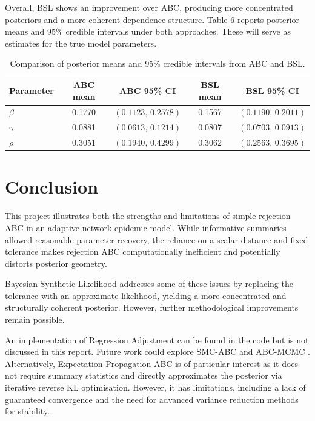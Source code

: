 \documentclass[12pt, a4paper]{article}
\begin{document}
Overall, BSL shows an improvement over ABC, producing more concentrated posteriors and a more coherent dependence structure. Table 6 reports posterior means and 95\% credible intervals under both approaches. These will serve as estimates for the true model parameters.

\begin{table}[H]
\centering
\begin{tabular}{lcccc}
\toprule
Parameter & ABC mean & ABC 95\% CI & BSL mean & BSL 95\% CI \\
\midrule
$\beta$  & 0.1770 & $(0.1123,\,0.2578)$ & 0.1567 & $(0.1190,\,0.2011)$ \\
$\gamma$ & 0.0881 & $(0.0613,\,0.1214)$ & 0.0807 & $(0.0703,\,0.0913)$ \\
$\rho$   & 0.3051 & $(0.1940,\,0.4299)$ & 0.3062 & $(0.2563,\,0.3695)$ \\
\bottomrule
\end{tabular}
\caption{Comparison of posterior means and 95\% credible intervals 
         from ABC and BSL.}
\label{tab:ci_comparison}
\end{table}


\section{Conclusion}
This project illustrates both the strengths and limitations of simple
rejection ABC in an adaptive-network epidemic model. While informative
summaries allowed reasonable parameter recovery, the reliance on a scalar
distance and fixed tolerance makes rejection ABC computationally inefficient
and potentially distorts posterior geometry.

Bayesian Synthetic Likelihood addresses some of these issues by replacing
the tolerance with an approximate likelihood, yielding a more concentrated
and structurally coherent posterior. However, further methodological
improvements remain possible.

An implementation of Regression Adjustment \citep{beaumont2002approximate} can be found in the code but is not discussed in this report. Future work could explore SMC-ABC \citep{Sisson2007} and ABC-MCMC \citep{marjoram2013approximation}. Alternatively, Expectation-Propagation ABC \citep{barthelme2014expectation} is of particular interest as it does not require summary statistics and directly approximates the posterior via iterative reverse KL optimisation. However, it has limitations, including a lack of guaranteed convergence and the need for advanced variance reduction methods for stability. 
\end{document}
